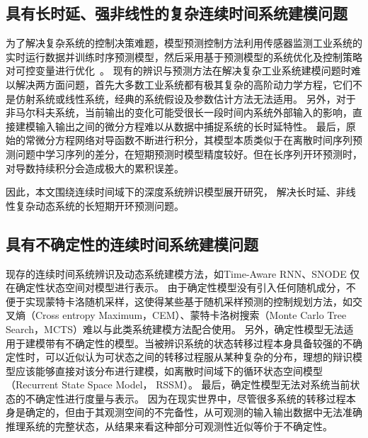 \subsection{具有长时延、强非线性的复杂连续时间系统建模问题}
为了解决复杂系统的控制决策难题，模型预测控制方法利用传感器监测工业系统的实时运行数据并训练时序预测模型，然后采用基于预测模型的系统优化及控制策略对可控变量进行优化~\cite{Yuan2020,Member2019,wu2020optimization}。
现有的辨识与预测方法在解决复杂工业系统建模问题时难以解决两方面问题，首先大多数工业系统都有极其复杂的高阶动力学方程，它们不是仿射系统或线性系统，经典的系统假设及参数估计方法无法适用。
另外，对于非马尔科夫系统，当前输出的变化可能受很长一段时间内系统外部输入的影响，直接建模输入输出之间的微分方程难以从数据中捕捉系统的长时延特性。
最后，原始的常微分方程网络对导函数不断进行积分，其模型本质类似于在离散时间序列预测问题中学习序列的差分，在短期预测时模型精度较好。但在长序列开环预测时，对导数持续积分会造成极大的累积误差。

因此，本文围绕连续时间域下的深度系统辨识模型展开研究，
解决长时延、非线性复杂动态系统的长短期开环预测问题。



\subsection{具有不确定性的连续时间系统建模问题}
现存的连续时间系统辨识及动态系统建模方法，如Time-Aware RNN\cite{Demeester2019}、SNODE\cite{Quaglino2019} 仅在确定性状态空间对模型进行表示。
由于确定性模型没有引入任何随机成分，不便于实现蒙特卡洛随机采样，这使得某些基于随机采样预测的控制规划方法，如交叉熵（Cross entropy Maximum，CEM）、蒙特卡洛树搜索（Monte Carlo Tree Search，MCTS）难以与此类系统建模方法配合使用。
另外，确定性模型无法适用于建模带有不确定性的模型。当被辨识系统的状态转移过程本身具备较强的不确定性时，可以近似认为可状态之间的转移过程服从某种复杂的分布，理想的辩识模型应该能够直接对该分布进行建模，如离散时间域下的循环状态空间模型\cite{Hafner2019}（Recurrent State Space Model， RSSM）。
最后，确定性模型无法对系统当前状态的不确定性进行度量与表示。
因为在现实世界中，尽管很多系统的转移过程本身是确定的，但由于其观测空间的不完备性，从可观测的输入输出数据中无法准确推理系统的完整状态，从结果来看这种部分可观测性近似等价于不确定性。

